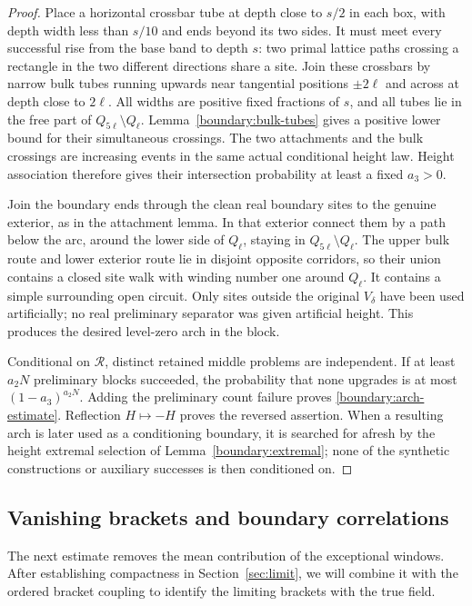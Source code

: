 \documentclass[11pt]{article}
\theoremstyle{definition}
\theoremstyle{remark}
\numberwithin{equation}{section}
\begin{document}
\begin{proof}
Place a horizontal crossbar tube at depth close to $s/2$ in each
box, with depth width less than $s/10$ and ends beyond its two
sides.  It must meet every successful rise from the base band to
depth $s$: two primal lattice paths crossing a rectangle in the
two different directions share a site.  Join these crossbars by
narrow bulk tubes running upwards near tangential positions
$\pm2\ell$ and across at depth close to $2\ell$.  All widths are
positive fixed fractions of $s$, and all tubes lie in the free
part of $Q_{5\ell}\setminus Q_\ell$.
Lemma~\ref{boundary:bulk-tubes} gives a positive lower bound for their
simultaneous crossings.
The two attachments and the bulk crossings are increasing events
in the same actual conditional height law.  Height association
therefore gives their intersection probability at least a fixed
$a_3>0$.

Join the boundary ends through the clean real boundary sites to
the genuine exterior, as in the attachment lemma.  In that exterior
connect them by a path below the arc, around the lower side of
$Q_\ell$, staying in $Q_{5\ell}\setminus Q_\ell$.  The upper bulk
route and lower exterior route lie in disjoint opposite corridors,
so their union contains a closed site walk with winding number one
around $Q_\ell$.  It contains a simple surrounding open circuit.
Only sites outside the original $V_\delta$ have been used
artificially; no real preliminary separator was given artificial
height.  This produces the desired level-zero arch in the block.

Conditional on $\mathcal R$, distinct retained middle problems are
independent.  If at least $a_2N$ preliminary blocks succeeded, the
probability that none upgrades is at most $(1-a_3)^{a_2N}$.
Adding the preliminary count failure proves
\eqref{boundary:arch-estimate}.  Reflection $H\mapsto-H$ proves the
reversed assertion.  When a resulting arch is later used as a
conditioning boundary, it is searched for afresh by the height
extremal selection of Lemma~\ref{boundary:extremal}; none of the
synthetic constructions or auxiliary successes is then conditioned
on.
\end{proof}

\subsection{Vanishing brackets and boundary correlations}

The next estimate removes the mean contribution of the exceptional
windows.  After establishing compactness in Section~\ref{sec:limit},
we will combine it with the ordered bracket coupling to identify the
limiting brackets with the true field.
\end{document}
